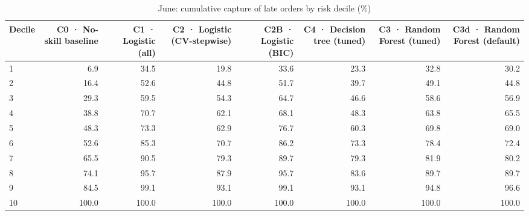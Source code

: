 \begin{table}[htbp]
\centering
\small
\caption{June: cumulative capture of late orders by risk decile (\%)}
\begin{tabular}{lrrrrrrr}
\toprule
Decile & C0 · No-skill baseline & C1 · Logistic (all) & C2 · Logistic (CV-stepwise) & C2B · Logistic (BIC) & C4 · Decision tree (tuned) & C3 · Random Forest (tuned) & C3d · Random Forest (default) \\
\midrule
1 & 6.9 & 34.5 & 19.8 & 33.6 & 23.3 & 32.8 & 30.2 \\
2 & 16.4 & 52.6 & 44.8 & 51.7 & 39.7 & 49.1 & 44.8 \\
3 & 29.3 & 59.5 & 54.3 & 64.7 & 46.6 & 58.6 & 56.9 \\
4 & 38.8 & 70.7 & 62.1 & 68.1 & 48.3 & 63.8 & 65.5 \\
5 & 48.3 & 73.3 & 62.9 & 76.7 & 60.3 & 69.8 & 69.0 \\
6 & 52.6 & 85.3 & 70.7 & 86.2 & 73.3 & 78.4 & 72.4 \\
7 & 65.5 & 90.5 & 79.3 & 89.7 & 79.3 & 81.9 & 80.2 \\
8 & 74.1 & 95.7 & 87.9 & 95.7 & 83.6 & 89.7 & 89.7 \\
9 & 84.5 & 99.1 & 93.1 & 99.1 & 93.1 & 94.8 & 96.6 \\
10 & 100.0 & 100.0 & 100.0 & 100.0 & 100.0 & 100.0 & 100.0 \\
\bottomrule
\end{tabular}
\par\smallskip\begin{minipage}{\linewidth}\footnotesize \end{minipage}
\end{table}


